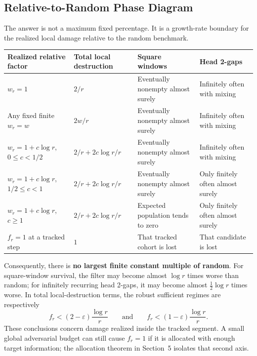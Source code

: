 \subsection{Relative-to-Random Phase Diagram}
The answer is not a maximum fixed percentage. It is a growth-rate boundary for the realized local damage relative to the random benchmark.
\begin{longtable}{@{}>{\raggedright\arraybackslash}p{}>{\raggedright\arraybackslash}p{}>{\raggedright\arraybackslash}p{}>{\raggedright\arraybackslash}p{}@{}}
\toprule
Realized relative factor & Total local destruction & Square windows & Head 2-gaps \\
\midrule
$w_r=1$ & $2/r$ & Eventually nonempty almost surely & Infinitely often with mixing \\
Any fixed finite $w_r=w$ & $2w/r$ & Eventually nonempty almost surely & Infinitely often with mixing \\
$w_r=1+c\log r$, $0\le c < 1/2$ & $2/r+2c\log r/r$ & Eventually nonempty almost surely & Infinitely often with mixing \\
$w_r=1+c\log r$, $1/2\le c < 1$ & $2/r+2c\log r/r$ & Eventually nonempty almost surely & Only finitely often almost surely \\
$w_r=1+c\log r$, $c\ge1$ & $2/r+2c\log r/r$ & Expected population tends to zero & Only finitely often almost surely \\
$f_r=1$ at a tracked step & $1$ & That tracked cohort is lost & That candidate is lost \\
\bottomrule
\end{longtable}
Consequently, there is \textbf{no largest finite constant multiple of random}. For square-window survival, the filter may become almost $\log r$ times worse than random; for infinitely recurring head 2-gaps, it may become almost $\tfrac12\log r$ times worse. In total local-destruction terms, the robust sufficient regimes are respectively
\begin{equation*}
f_r < (2-\varepsilon)\frac{\log r}{r}
\qquad\text{and}\qquad
f_r < (1-\varepsilon)\frac{\log r}{r}.
\end{equation*}
These conclusions concern damage realized inside the tracked segment. A small global adversarial budget can still cause $f_r=1$ if it is allocated with enough target information; the allocation theorem in Section~5 isolates that second axis.
